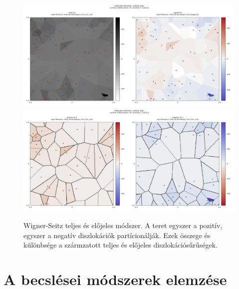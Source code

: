 \documentclass[10pt,a4paper]{scrartcl}
\begin{document}
\begin{center}
\begin{figure}
\includegraphics[width=\textwidth]{"../xpattern/example_with_64_dislocations/1000_64.dconfwspn_r512_ts.txt"}
\includegraphics[width=\textwidth]{"../xpattern/example_with_64_dislocations/1000_64.dconfwspn_r512_pn.txt"}
\caption{Wigner-Seitz teljes és előjeles módszer. A teret egyszer a pozitív, egyszer a negatív diszlokációk partícionálják. Ezek összege és különbsége a szármzatott teljes és előjeles diszlokációsűrűségek.}
\end{figure}
\end{center}

\section{A becslései módszerek elemzése}
\end{document}
